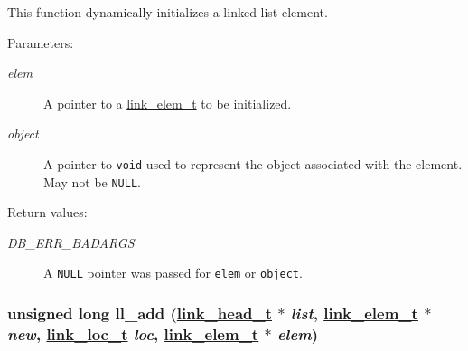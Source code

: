 This function dynamically initializes a linked list element.\begin{Desc}
\item[Parameters: ]\par
\begin{description}
\item[{\em 
elem}]A pointer to a \hyperlink{group__dbprim__link_a1}{link\_\-elem\_\-t} to be initialized. \item[{\em 
object}]A pointer to {\tt void} used to represent the object associated with the element. May not be {\tt NULL}.\end{description}
\end{Desc}
\begin{Desc}
\item[Return values: ]\par
\begin{description}
\item[{\em 
DB\_\-ERR\_\-BADARGS}]A {\tt NULL} pointer was passed for {\tt elem} or {\tt object}. \end{description}
\end{Desc}
\hypertarget{group__dbprim__link_a6}{
\subsubsection[ll\_\-add]{\setlength{\rightskip}{0pt plus 5cm}unsigned long ll\_\-add (\hyperlink{group__dbprim__link_a0}{link\_\-head\_\-t} $\ast$ {\em list}, \hyperlink{group__dbprim__link_a1}{link\_\-elem\_\-t} $\ast$ {\em new}, \hyperlink{group__dbprim__link_a4}{link\_\-loc\_\-t} {\em loc}, \hyperlink{group__dbprim__link_a1}{link\_\-elem\_\-t} $\ast$ {\em elem})}}
\label{group__dbprim__link_a6}


